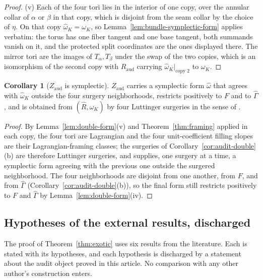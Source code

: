 \documentclass[11pt]{article}
\theoremstyle{definition}
\newtheorem{corollary}[theorem]{Corollary}
\begin{document}
\begin{proof}
(v) Each of the four tori lies in the interior of one copy, over the
annular collar of $\alpha$ or $\beta$ in that copy, which is disjoint from
the seam collar by the choice of $\eta$.  On that copy $\hat\omega_K=\omega_K$,
so Lemma~\ref{lem:bundle-symplectic-form} applies verbatim: the torus has
one fiber tangent and one base tangent, both summands vanish on it, and the
protected split coordinates are the ones displayed there.  The mirror tori
are the images of $T_\alpha,T_\beta$ under the swap of the two copies, which
is an isomorphism of the second copy with $R_{\mathrm{aud}}$ carrying
$\hat\omega_K|_{\text{copy }2}$ to $\omega_K$.
\end{proof}

\begin{corollary}[$Z_{\mathrm{aud}}$ is symplectic]\label{cor:Z-symplectic}
$Z_{\mathrm{aud}}$ carries a symplectic form $\hat\omega$ that agrees with
$\hat\omega_K$ outside the four surgery neighborhoods, restricts positively
to $F$ and to $\hat\Gamma$, and is obtained from $(\hat R,\hat\omega_K)$ by
four Luttinger surgeries in the sense of \cite[Definition~2.1]{ADK}.
\end{corollary}

\begin{proof}
By Lemma~\ref{lem:double-form}(v) and Theorem~\ref{thm:framing} applied in
each copy, the four tori are Lagrangian and the four unit-coefficient filling
slopes are their Lagrangian-framing classes; the surgeries of
Corollary~\ref{cor:audit-double}(b) are therefore Luttinger surgeries, and
\cite[Proposition~2.2]{ADK} supplies, one surgery at a time, a symplectic
form agreeing with the previous one outside the surgered neighborhood.  The
four neighborhoods are disjoint from one another, from $F$, and from
$\hat\Gamma$ (Corollary~\ref{cor:audit-double}(b)), so the final form still
restricts positively to $F$ and $\hat\Gamma$ by Lemma~\ref{lem:double-form}(iv).
\end{proof}

\subsection{Hypotheses of the external results, discharged}
\label{sec:external-hypotheses}

The proof of Theorem~\ref{thm:exotic} uses six results from the
literature.  Each is stated with its hypotheses, and each hypothesis is
discharged by a statement about the audit object proved in this article.
No comparison with any other author's construction enters.
\end{document}
